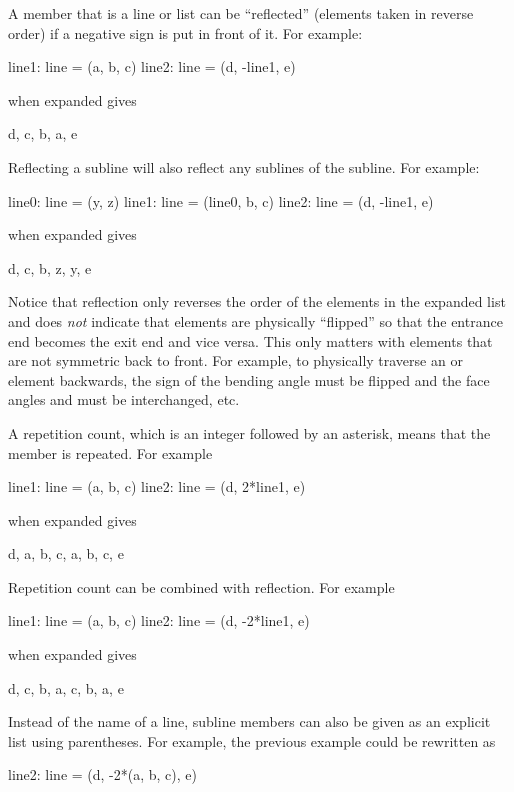 A member that is a line or list can be ``reflected''
(elements taken in reverse order) if
a negative sign is put in front of it. For example:
\begin{example}
  line1: line = (a, b, c)
  line2: line = (d, -line1, e)
\end{example}
 when expanded gives
\begin{example}
  d, c, b, a, e
\end{example}
Reflecting a subline will also reflect any sublines of the subline. For
example:
\begin{example}
  line0: line = (y, z)
  line1: line = (line0, b, c)
  line2: line = (d, -line1, e)
\end{example}
 when expanded gives
\begin{example}
  d, c, b, z, y, e
\end{example}
Notice that reflection only reverses the order of the elements in the
expanded list and does {\em not} indicate that elements are physically
``flipped'' so that the entrance end becomes the exit end and vice
versa. This only matters with elements that are not symmetric back to
front. For example, to physically traverse an  or 
element backwards, the sign of the bending angle must be flipped and
the face angles  and  must be interchanged, etc.

A repetition count, which is an integer followed by an asterisk, 
means that the member is
repeated. For example
\begin{example}
  line1: line = (a, b, c)
  line2: line = (d, 2*line1, e)
\end{example}
 when expanded gives
\begin{example}
  d, a, b, c, a, b, c, e
\end{example}
Repetition count can be combined with reflection. For example
\begin{example}
  line1: line = (a, b, c)
  line2: line = (d, -2*line1, e)
\end{example}
 when expanded gives
\begin{example}
  d, c, b, a, c, b, a, e
\end{example}
Instead of the name of a line, subline members can also be given as an explicit 
list using parentheses. For example, the previous example could be rewritten as
\begin{example}
  line2: line = (d, -2*(a, b, c), e)
\end{example}

